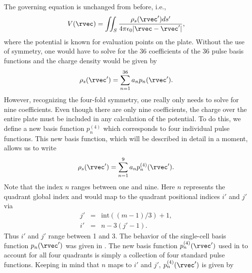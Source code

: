 The governing equation is unchanged from before, i.e.,
\begin{equation}
  V(\rvec) =
  \iint_{S}\frac{\rho_s(\rvec')ds'}{4\pi\epsilon_0|\rvec-\rvec'|},
  \label{eq:governingEQ}
\end{equation}
where the potential is known for evaluation points on the plate.
Without the use of symmetry, one would have to solve for the 36
coefficients of the 36 pulse basis functions and the charge density
would be given by
\begin{equation}
  \rho_s(\rvec') = \sum_{n=1}^{36} a_np_n(\rvec').
\end{equation}
However, recognizing the four-fold symmetry, one really only needs to
solve for nine coefficients.  Even though there are only nine
coefficients, the charge over the entire plate must be included in any
calculation of the potential.  To do this, we define a new basis
function $p_n^{(4)}$ which corresponds to four individual pulse
functions.  This new basis function, which will be described in detail
in a moment, allows us to write
\begin{equation}
  \rho_s(\rvec') = \sum_{n=1}^9 a_n p^{(4)}_n(\rvec').
  \label{eq:chargeSymmetric}
\end{equation}
Note that the index $n$ ranges between one and nine.  Here $n$
represents the quadrant global index and would map to the quadrant
positional indices $i'$ and $j'$ via
\begin{eqnarray}
  j' &=& \text{int}((m-1)/3) + 1, \\
  i' &=& n - 3(j'-1).
\end{eqnarray}
Thus $i'$ and $j'$ range between 1 and 3.  The behavior of the
single-cell basis function $p_n(\rvec')$ was given in
.  The new basis function $p^{(4)}_n(\rvec')$
used in  to account for all four quadrants
is simply a collection of four standard pulse functions.  Keeping in
mind that $n$ maps to $i'$ and $j'$, $p^{(4)}_n(\rvec')$ is given by
